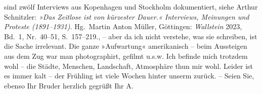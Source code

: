 {{{                     sind zwölf Interviews aus Kopenhagen und Stockholm dokumentiert, siehe Arthur Schnitzler: \emph{»Das
                        Zeitlose ist von kürzester Dauer.« Interviews, Meinungen und Proteste
                        (1891–1931)}. Hg. Martin Anton Müller,
                     Göttingen: \emph{Wallstein}{ }2023, Bd. 1, Nr. 40–51,
                     S. 157–219.}}}\label{K_L04495-5}, – aber da ich nicht verstehe, was sie
               schreiben, ist die Sache irrelevant. Die ganze »Aufwartung« {\pb}amerikanisch – beim Aussteigen aus dem Zug war
               man photographirt, gefilmt u.s.w. Ich befinde mich trotzdem wohl – die Städte,
               Menschen, Landschaft, Atmosphäre thun mir wohl. Leider ist es immer kalt – der
               Frühling ist viele Wochen hinter unserm zurück. – Seien Sie, ebenso Ihr Bruder herzlich gegrüßt\pend
           \pstart Ihr \spacefill\mbox{A.}\pend{}\endnumbering{}
\begin{anhang}
\end{anhang}\newcommand{\dateiname}{L04495}\newcommand{\titel}{Arthur Schnitzler an Gustav Schwarzkopf, 18. 5. 1923}\newcommand{\editorInnen}{Herausgegeben von Jahnke, SelmaMüller, Martin Anton}
